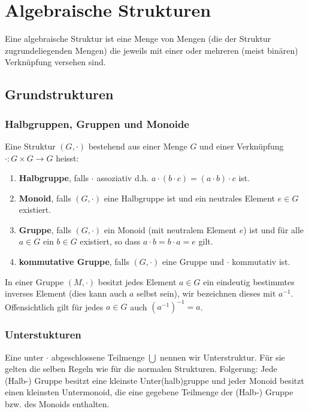 \chapter{Algebraische Strukturen}
Eine algebraische Struktur ist eine Menge von Mengen (die der Struktur zugrundeliegenden Mengen) die jeweils mit einer oder mehreren (meist binären) Verknüpfung versehen sind.
\section{Grundstrukturen}
\subsection{Halbgruppen, Gruppen und Monoide}
\begin{definition}
Eine Struktur $(G, \cdot)$ bestehend aus einer Menge $G$ und einer Verknüpfung $\cdot : G \times G \rightarrow G$ heisst:
\begin{enumerate}
	\item \textbf{Halbgruppe}, falls $\cdot$ assoziativ d.h. $a \cdot ( b \cdot c) = (a \cdot b) \cdot c$ ist.
	\item \textbf{Monoid}, falls $(G, \cdot)$ eine Halbgruppe ist und ein neutrales Element $e \in G$ existiert.
	\item \textbf{Gruppe}, falls $(G, \cdot)$ ein Monoid (mit neutralem Element $e$) ist und für alle $a \in G$ ein $b \in G$ existiert, so dass $a \cdot b = b \cdot a = e$ gilt.
	\item \textbf{kommutative Gruppe}, falls $(G, \cdot)$ eine Gruppe und $\cdot$ kommutativ ist.
\end{enumerate}
\end{definition}

\begin{bem}
In einer Gruppe $(M, \cdot)$ besitzt jedes Element $a \in G$ ein eindeutig bestimmtes inverses Element (dies kann auch $a$ selbst sein), wir bezeichnen dieses mit $a^{-1}$. Offensichtlich gilt für jedes $a \in G$ auch $(a^{-1})^{-1} = a$.
\end{bem}

\subsection{Unterstukturen}
Eine unter $\cdot$ abgeschlossene Teilmenge $\bigcup$ nennen wir Unterstruktur. Für sie gelten die selben Regeln wie für die normalen Strukturen. Folgerung: Jede (Halb-) Gruppe besitzt eine kleinste Unter(halb)gruppe und jeder Monoid besitzt einen kleinsten Untermonoid, die eine gegebene Teilmenge der (Halb-) Gruppe bzw. des Monoids enthalten.


